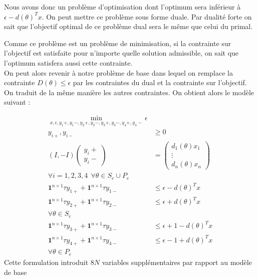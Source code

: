 Nous avons donc un problème d'optimisation dont l'optimum sera inférieur à $\epsilon- d(\theta)^T x $. On peut mettre ce problème sous forme duale. Par dualité forte on sait que l'objectif optimal de ce problème dual sera le même que celui du primal.

Comme ce problème est un problème de minimisation, si la contrainte sur l'objectif est satisfaite pour n'importe quelle solution admissible, on sait que l'optimum satisfera aussi cette contrainte.\\
On peut alors revenir à notre problème de base dans lequel on remplace la contrainte $D(\theta)\leq \epsilon$ par les contraintes du dual et la contrainte sur l'objectif.
On traduit de la même manière les autres contraintes. On obtient alors le modèle suivant :

\begin{align*}
\min_{x,\epsilon ,y_1+,y_1-,y_2+,y_2-,y_3+,y_3-,y_4+,y_4-} \epsilon &  \\
y_{i+},y_{i-}  & \geq  0 \\
(I,-I)
 \begin{pmatrix}
y_i+ \\
y_i-
\end{pmatrix}
& = 
\begin{pmatrix}
d_1(\theta)x_1 \\
\vdots \\
d_n(\theta)x_n 
\end{pmatrix} \\
\forall i = 1,2,3,4\:\:
\forall \theta \in S_e \cup P_e  &  \\
\mathbf{1}^{n\times 1}\tau y_{1+}+\mathbf{1}^{n\times 1}\tau y_{1-} & \leq \epsilon -d(\theta)^Tx \\
\mathbf{1}^{n\times 1}\tau y_{2+}+\mathbf{1}^{n\times 1}\tau y_{2-} & \leq \epsilon + d(\theta)^Tx \\
\forall \theta \in S_e &  \\
\mathbf{1}^{n\times 1}\tau y_{3+}+\mathbf{1}^{n\times 1}\tau y_{3-} & \leq  \epsilon +1 -d(\theta)^Tx \\
\mathbf{1}^{n\times 1}\tau y_{4+}+\mathbf{1}^{n\times 1}\tau y_{4-} & \leq  \epsilon -1 + d(\theta)^Tx \\
\forall \theta \in P_e & 
\end{align*}
Cette formulation introduit $8N$ variables supplémentaires par rapport au modèle de base
\FloatBarrier

